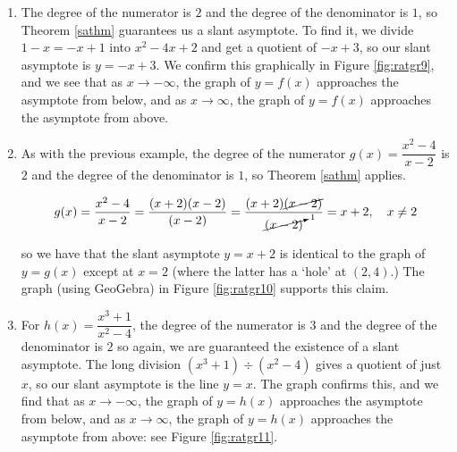 {
\begin{enumerate}

\item  The degree of the numerator is $2$ and the degree of the denominator is $1$, so Theorem \ref{sathm} guarantees us a slant asymptote.  To find it, we divide $1-x = -x+1$ into $x^2-4x+2$ and get a quotient of $-x+3$, so our slant asymptote is $y=-x+3$.  We confirm this graphically in Figure \ref{fig:ratgr9}, and we see that as $x \rightarrow -\infty$, the graph of $y=f(x)$ approaches the asymptote from below, and as $x \rightarrow \infty$, the graph of $y=f(x)$ approaches the asymptote from above.



\item  As with the previous example, the degree of the numerator $g(x) = \dfrac{x^2-4}{x-2}$ is $2$ and the degree of the denominator is $1$, so Theorem \ref{sathm} applies.  

\[ g(x) = \dfrac{x^2-4}{x-2} = \dfrac{(x+2)(x-2)}{(x-2)} = \dfrac{(x+2) \cancel{(x-2)}}{\cancelto{1}{(x-2)}} = x+2, \quad x \neq 2\]

so we have that the slant asymptote $y=x+2$ is identical to the graph of $y=g(x)$ except at $x=2$ (where the latter has a `hole' at $(2,4)$.)  The graph (using GeoGebra) in Figure \ref{fig:ratgr10} supports this claim.



\item   For $h(x) = \dfrac{x^3+1}{x^2-4}$, the degree of the numerator is $3$ and the degree of the denominator is $2$ so again, we are guaranteed the existence of a slant asymptote.  The long division $\left(x^3+1 \right) \div \left(x^2-4\right)$ gives a quotient of just $x$, so our slant asymptote is the line $y=x$.  The graph confirms this, and we find that as $x \rightarrow -\infty$, the graph of $y=h(x)$ approaches the asymptote from below, and as $x \rightarrow \infty$, the graph of $y=h(x)$ approaches the asymptote from above: see Figure \ref{fig:ratgr11}. 


\end{enumerate}}
